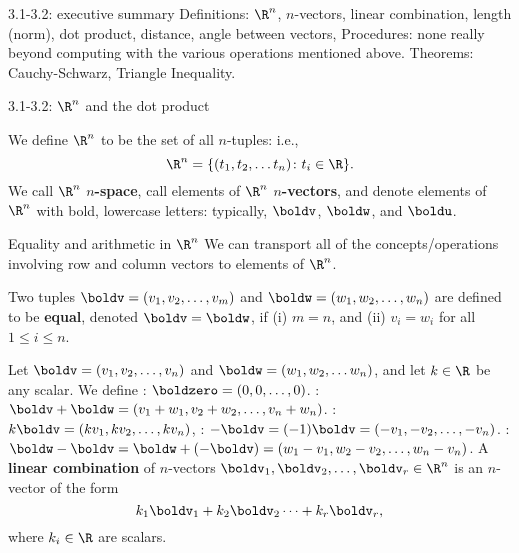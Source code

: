 \begin{frame}{3.1-3.2: executive summary}
\alert{Definitions:} $\R^n$, $n$-vectors, linear combination, length (norm), dot product, distance, angle between vectors, 
\bspace
\alert{Procedures:} none really beyond computing with the various operations mentioned above. 
\bspace
\alert{Theorems:} Cauchy-Schwarz, Triangle Inequality.
\end{frame}
\begin{frame}{3.1-3.2: $\R^n$ and the dot product}
\footnotesize
\begin{definition}
We define $\R^n$ to be the set of {\color{red} all} $n$-tuples: i.e., 
\[
\R^n=\{(t_1,t_2,\dots t_n)\colon t_i\in\R \}.
\]
We call $\R^n$ {\bf $n$-space}, call elements of $\R^n$ {\bf $n$-vectors}, and denote elements of $\R^n$ with bold, lowercase letters: typically, $\boldv$, $\boldw$, and $\boldu$. 
\end{definition}
\pause
\begin{comment}
Technically an $n$-tuple is not the same thing as a matrix. An $n$-tuple $\boldv=(t_1,t_2,\dots ,t_n)$ is called a {\bf comma-delimited} form of a sequence, whereas matrices represent sequences as {\em rectangular arrays}. 
\bpause
Indeed there are two natural choices of matrices representing the $n$-tuple $\boldv$: the {\bf column-vector  form}
\[
\begin{bmatrix}
t_1\\t_2\\ \vdots \\ t_n
\end{bmatrix},
\]
or the {\bf row-vector form}
\[
\begin{bmatrix}t_1& t_2&\dots &t_n \end{bmatrix}.
\]
\end{comment}
\end{frame}
\begin{frame}{Equality and arithmetic in $\R^n$}
\footnotesize
We can transport all of the concepts/operations involving row and column vectors to elements of $\R^n$. 
\begin{definition}
Two tuples $\boldv=(v_1,v_2,\dots, v_m)$ and $\boldw=(w_1,w_2,\dots, w_n)$ are defined to be {\bf equal}, denoted $\boldv=\boldw$, if \alert{(i)} $m=n$, and 
\alert{(ii)} $v_i=w_i$ for all $1\leq i\leq n$. 
\end{definition}
\pause
\begin{definition}
Let $\boldv=(v_1,v_2,\dots,v_n)$ and $\boldw=(w_1,w_2,\dots w_n)$, and let $k\in\R$ be any scalar. We define
\bb
{}: $\boldzero=(0,0,\dots,0)$.
: $\boldv+\boldw=(v_1+w_1,v_2+w_2,\dots, v_n+w_n)$.
: $k\boldv=(kv_1,kv_2,\dots, kv_n)$,
: $-\boldv=(-1)\boldv=(-v_1,-v_2,\dots,-v_n)$.
: $\boldw-\boldv=\boldw+(-\boldv)=(w_1-v_1,w_2-v_2,\dots ,w_n-v_n)$. 
\ee
\pause A {\bf linear combination} of $n$-vectors $\boldv_1, \boldv_2,\dots, \boldv_r\in\R^n$ is an $n$-vector of the form 
\[
k_1\boldv_1+k_2\boldv_2\cdots +k_r\boldv_r,
\]
where $k_i\in\R$ are scalars. 
\end{definition}
\end{frame}

